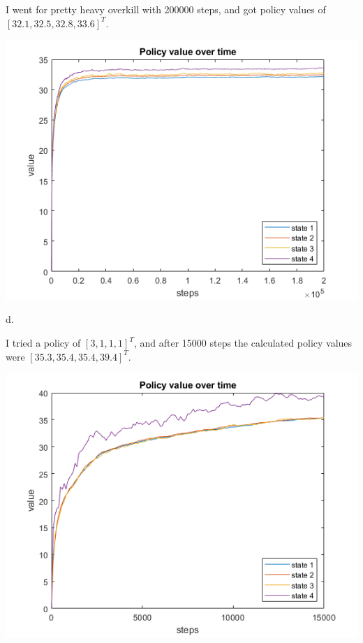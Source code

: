 \documentclass{article}
\begin{document}
\noindent 
I went for pretty heavy overkill with 200000 steps, and got policy values of $[32.1,32.5,32.8,33.6]^T$.

\begin{center}
    \includegraphics[scale=1]{1c-2.png}
\end{center}

\noindent
d. 

\noindent 
I tried a policy of $[3,1,1,1]^T$, and after 15000 steps the calculated policy values were $[35.3,35.4,35.4,39.4]^T$.

\begin{center}
    \includegraphics[scale=1]{1d.png}
\end{center}
\end{document}
